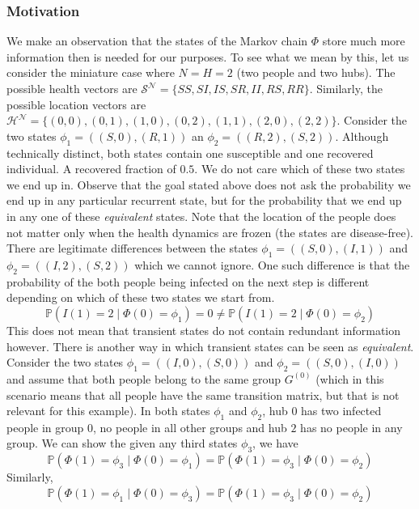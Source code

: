 \documentclass[a4paper]{article}
\begin{document}
	\subsubsection{Motivation}
	We make an observation that the states of the Markov chain $\Phi$ store much more information then is needed for our purposes. To see what we mean by this, let us consider the miniature case where $N = H = 2$ (two people and two hubs). The possible health vectors are $\mathcal{S}^{\mathcal{N}} = \{SS, SI, IS, SR, II, RS, RR\}$. Similarly, the possible location vectors are $\mathcal{H}^{\mathcal{N}} = \{(0,0), (0, 1), (1, 0), (0, 2), (1, 1), (2, 0), (2,2)\}$. Consider the two states $\phi_{1} = ((S, 0), (R, 1))$ an $\phi_{2} = ((R, 2), (S, 2))$. Although technically distinct, both states contain one susceptible and one recovered individual. A recovered fraction of $0.5$. We do not care which of these two states we end up in. Observe that the goal stated above does not ask the probability we end up in any particular recurrent state, but for the probability that we end up in any one of these \textit{equivalent} states. Note that the location of the people does not matter only when the health dynamics are frozen (the states are disease-free). There are legitimate differences between the states $\phi_{1} = ((S, 0), (I, 1))$ and $\phi_{2} = ((I, 2), (S, 2))$ which we cannot ignore. One such difference is that the probability of the both people being infected on the next step is different depending on which of these two states we start from.
	$$\mathbb{P}(I(1) = 2 \mid \Phi(0) = \phi_{1}) = 0 \neq \mathbb{P}(I(1) = 2 \mid \Phi(0) = \phi_{2})$$
	This does not mean that transient states do not contain redundant information however. There is another way in which transient states can be seen as \textit{equivalent}. Consider the two states $\phi_{1} = ((I, 0), (S, 0))$ and $\phi_{2} = ((S, 0), (I, 0))$ and assume that both people belong to the same group $G^{(0)}$ (which in this scenario means that all people have the same transition matrix, but that is not relevant for this example). In both states $\phi_{1}$ and $\phi_{2}$, hub $0$ has two infected people in group $0$, no people in all other groups and hub $2$ has no people in any group. We can show the given any third states $\phi_{3}$, we have
	$$\mathbb{P}(\Phi(1) = \phi_{3} \mid \Phi(0) = \phi_{1}) = \mathbb{P}(\Phi(1) = \phi_{3} \mid \Phi(0) = \phi_{2})$$
	Similarly,
	$$\mathbb{P}(\Phi(1) = \phi_{1} \mid \Phi(0) = \phi_{3}) = \mathbb{P}(\Phi(1) = \phi_{3} \mid \Phi(0) = \phi_{2})$$
	
\end{document}

